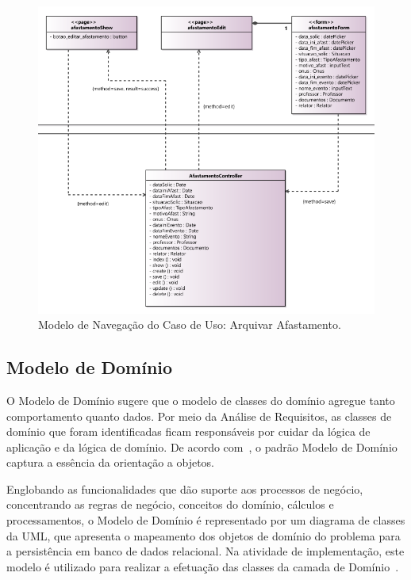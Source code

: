 \begin{figure}[h]
	\centering
	\includegraphics[scale=0.5]{figuras/fig-projeto-navegacao2} 
	\caption{Modelo de Navegação do Caso de Uso: Arquivar Afastamento.}
	\label{fig-projeto-navegacao2}
\end{figure} 

\subsection{Modelo de Domínio}
\label{sec-projeto-modelo-dominio}

O Modelo de Domínio sugere que o modelo de classes do domínio agregue tanto comportamento quanto dados. Por meio da Análise de Requisitos, as classes de domínio que foram identificadas ficam responsáveis por cuidar da lógica de aplicação e da lógica de domínio. De acordo com~, o padrão Modelo de Domínio captura a essência da orientação a objetos.

Englobando as funcionalidades que dão suporte aos processos de negócio, concentrando as regras de negócio, conceitos do domínio, cálculos e processamentos, o Modelo de Domínio é representado por um diagrama de classes da UML, que apresenta o mapeamento dos objetos de domínio do problema para a persistência em banco de dados relacional. Na atividade de implementação, este modelo é utilizado para realizar a efetuação das classes da camada de Domínio~\cite{souza:masterthesis07}.

